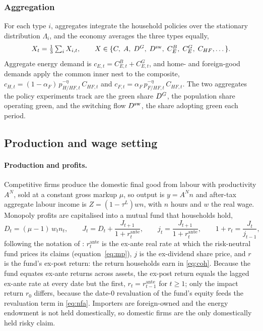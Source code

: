 \subsubsection{Aggregation}\label{sec:agg2}

For each type $i$, aggregates integrate the household policies over the stationary
distribution $\Lambda_i$, and the economy averages the three types equally,
%
\begin{equation}
X_t=\tfrac13\textstyle\sum_i X_{i,t},
\qquad
X\in\{C,\;A,\;D^{G},\;D^{\mathrm{sw}},\;C^B_E,\;C^G_E,\;C_{HF},\dots\}.
\label{eq:agg}
\end{equation}
%
Aggregate energy demand is $c_{E,t}=C^B_{E,t}+C^G_{E,t}$, and home- and foreign-good demands apply
the common inner nest to the composite,
$c_{H,t}=(1-\alpha_F)\,p_{H/HF,t}^{-\eta}\,C_{HF,t}$ and
$c_{F,t}=\alpha_F\,p_{F/HF,t}^{-\eta}\,C_{HF,t}$. The two aggregates the policy experiments
track are the green share $D^{G}$, the population share operating green, and the
switching flow $D^{\mathrm{sw}}$, the share adopting green each period.

\subsection{Production and wage setting}\label{sec:firms}

\paragraph{Production and profits.}
Competitive firms produce the domestic final good from labour with productivity
$A^N$, sold at a constant gross markup $\mu$, so output is $y=A^N n$ and after-tax
aggregate labour income is $Z=(1-\tau^L)wn$, with $n$ hours and $w$ the real wage. Monopoly profits are capitalised into a mutual fund that households
hold,
%
\begin{equation}
D_t=(\mu-1)\,w_t n_t,
\qquad
J_t=D_t+\frac{J_{t+1}}{1+r^{\mathrm{ante}}_t},
\qquad
j_t=\frac{J_{t+1}}{1+r^{\mathrm{ante}}_t},
\qquad
1+r_t=\frac{J_t}{j_{t-1}},
\label{eq:fund}
\end{equation}
%
following the notation of \citet{auclert2023energy}: $r^{\mathrm{ante}}_t$ is the ex-ante real
rate at which the risk-neutral fund prices its claims (equation~\eqref{eq:mp}), $j$ is
the ex-dividend share price, and $r$ is the fund's ex-post return: the return
households earn in \eqref{eq:coh}. Because the fund equates ex-ante returns across
assets, the ex-post return equals the lagged ex-ante rate at every date but the
first, $r_t=r^{\mathrm{ante}}_{t-1}$ for $t\ge1$; only the impact return $r_0$ differs, because the date-0 revaluation of the
fund's equity feeds the revaluation term in \eqref{eq:nfa}. Importers are foreign-owned and the energy
endowment is not held domestically, so domestic firms are the only domestically held
risky claim.

